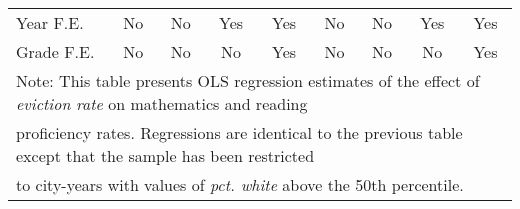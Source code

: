 \begin{table}[htbp]
\begin{tabular}{l*{8}{c}}
Year F.E.           &          No         &          No         &         Yes         &         Yes         &          No         &          No         &         Yes         &         Yes         \\
Grade F.E.          &          No         &          No         &          No         &         Yes         &          No         &          No         &          No         &         Yes         \\
\bottomrule
\multicolumn{9}{l}{\footnotesize Note: This table presents OLS regression estimates of the effect of \emph{eviction rate} on mathematics and reading}\\
\multicolumn{9}{l}{\footnotesize proficiency rates. Regressions are identical to the previous table except that the sample has been restricted}\\
\multicolumn{9}{l}{\footnotesize to city-years with values of \emph{pct. white} above the 50th percentile.}\\
\end{tabular}
\end{table}

